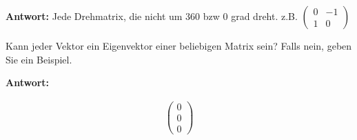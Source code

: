 \textbf{Antwort:}
Jede Drehmatrix, die nicht um 360 bzw 0 grad dreht. z.B. $\begin{pmatrix}
        0 & -1 \\
        1 & 0
    \end{pmatrix}$

Kann jeder Vektor ein Eigenvektor einer beliebigen Matrix sein? Falls nein,
geben Sie ein Beispiel.

\textbf{Antwort:}

\begin{align*}
    \begin{pmatrix}
        0 \\ 0 \\ 0
    \end{pmatrix}
\end{align*}